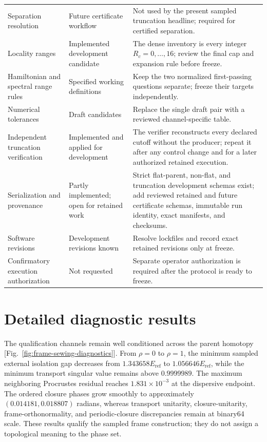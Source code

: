 \documentclass[11pt]{article}
\begin{document}
\begin{longtable}{@{}>{\raggedright\arraybackslash}p{}
                      >{\raggedright\arraybackslash}p{}
                      >{\raggedright\arraybackslash}p{}@{}}
Separation resolution & Future certificate workflow & Not used by the present sampled truncation headline; required for certified separation. \\
Locality ranges & Implemented development candidate & The dense inventory is every integer $R_c=0,\ldots,16$; review the final cap and expansion rule before freeze. \\
Hamiltonian and spectral range rules & Specified working definitions & Keep the two normalized first-passing questions separate; freeze their targets independently. \\
Numerical tolerances & Draft candidates & Replace the single draft pair with a reviewed channel-specific table. \\
Independent truncation verification & Implemented and applied for development & The verifier reconstructs every declared cutoff without the producer; repeat it after any control change and for a later authorized retained execution. \\
Serialization and provenance & Partly implemented; open for retained work & Strict flat-parent, non-flat, and truncation development schemas exist; add reviewed retained and future certificate schemas, immutable run identity, exact manifests, and checksums. \\
Software revisions & Development revisions known & Resolve lockfiles and record exact retained revisions only at freeze. \\
Confirmatory execution authorization & Not requested & Separate operator authorization is required after the protocol is ready to freeze. \\
\bottomrule
\end{longtable}
\normalsize

\section{Detailed diagnostic results}
\label{sec:diagnostic-results}

The qualification channels remain well conditioned across the parent homotopy
[Fig.~\ref{fig:frame-sewing-diagnostics}]. From $\rho=0$ to $\rho=1$, the minimum
sampled external isolation gap decreases from $1.343658E_{\mathrm{ref}}$ to $1.056646E_{\mathrm{ref}}$, while the minimum
transport singular value remains above $0.9999989$. The maximum neighboring Procrustes
residual reaches $1.831\times10^{-3}$ at the dispersive endpoint. The ordered closure
phases grow smoothly to approximately $(0.014181,0.018807)$ radians, whereas transport
unitarity, closure-unitarity, frame-orthonormality, and periodic-closure discrepancies remain
at binary64 scale. These results qualify the sampled frame construction; they do not
assign a topological meaning to the phase set.
\end{document}
